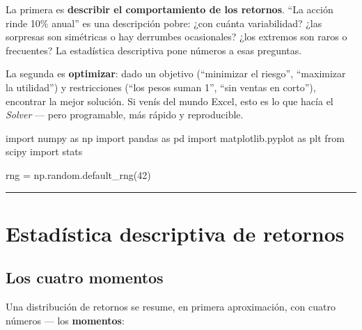 \documentclass[
  spanish,
  letterpaper,
  DIV=11,
  numbers=noendperiod]{scrreprt}
\newenvironment{Shaded}{\begin{snugshade}}{\end{snugshade}}
\newcommand{\DecValTok}[1]{\textcolor[rgb]{0.68,0.00,0.00}{#1}}
\newcommand{\ImportTok}[1]{\textcolor[rgb]{0.00,0.46,0.62}{#1}}
\newcommand{\NormalTok}[1]{\textcolor[rgb]{0.00,0.23,0.31}{#1}}
\newcommand{\OperatorTok}[1]{\textcolor[rgb]{0.37,0.37,0.37}{#1}}
\begin{document}
La primera es \textbf{describir el comportamiento de los retornos}. ``La
acción rinde 10\% anual'' es una descripción pobre: ¿con cuánta
variabilidad? ¿las sorpresas son simétricas o hay derrumbes ocasionales?
¿los extremos son raros o frecuentes? La estadística descriptiva pone
números a esas preguntas.

La segunda es \textbf{optimizar}: dado un objetivo (``minimizar el
riesgo'', ``maximizar la utilidad'') y restricciones (``los pesos suman
1'', ``sin ventas en corto''), encontrar la mejor solución. Si venís del
mundo Excel, esto es lo que hacía el \emph{Solver} --- pero programable,
más rápido y reproducible.

\label{setup}
\begin{Shaded}
\begin{Highlighting}[]
\ImportTok{import}\NormalTok{ numpy }\ImportTok{as}\NormalTok{ np}
\ImportTok{import}\NormalTok{ pandas }\ImportTok{as}\NormalTok{ pd}
\ImportTok{import}\NormalTok{ matplotlib.pyplot }\ImportTok{as}\NormalTok{ plt}
\ImportTok{from}\NormalTok{ scipy }\ImportTok{import}\NormalTok{ stats}

\NormalTok{rng }\OperatorTok{=}\NormalTok{ np.random.default\_rng(}\DecValTok{42}\NormalTok{)}
\end{Highlighting}
\end{Shaded}

\begin{center}\rule{0.5\linewidth}{0.5pt}\end{center}

\chapter{Estadística descriptiva de
retornos}\label{estaduxedstica-descriptiva-de-retornos}

\section{Los cuatro momentos}\label{los-cuatro-momentos}

Una distribución de retornos se resume, en primera aproximación, con
cuatro números --- los \textbf{momentos}:
\end{document}
